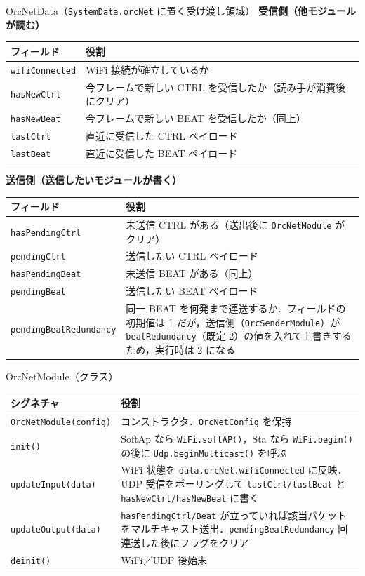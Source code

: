 \documentclass[lualatex,book,paper=a4paper,jafontsize=11.5pt,jafontscale=1.05]{jlreq}
\begin{document}
\begin{apibox}{OrcNetData（\texttt{SystemData.orcNet} に置く受け渡し領域）}
\textbf{受信側（他モジュールが読む）}\\[2pt]
\begin{tabular}{l p{}}
\toprule
\textbf{フィールド} & \textbf{役割} \\
\midrule
\texttt{wifiConnected} & WiFi 接続が確立しているか \\
\texttt{hasNewCtrl}    & 今フレームで新しい CTRL を受信したか（読み手が消費後にクリア） \\
\texttt{hasNewBeat}    & 今フレームで新しい BEAT を受信したか（同上） \\
\texttt{lastCtrl}      & 直近に受信した CTRL ペイロード \\
\texttt{lastBeat}      & 直近に受信した BEAT ペイロード \\
\bottomrule
\end{tabular}

\medskip
\textbf{送信側（送信したいモジュールが書く）}\\[2pt]
\begin{tabular}{l p{}}
\toprule
\textbf{フィールド} & \textbf{役割} \\
\midrule
\texttt{hasPendingCtrl}        & 未送信 CTRL がある（送出後に \texttt{OrcNetModule} がクリア） \\
\texttt{pendingCtrl}           & 送信したい CTRL ペイロード \\
\texttt{hasPendingBeat}        & 未送信 BEAT がある（同上） \\
\texttt{pendingBeat}           & 送信したい BEAT ペイロード \\
\texttt{pendingBeatRedundancy} & 同一 BEAT を何発まで連送するか．フィールドの初期値は 1 だが，送信側（\texttt{OrcSenderModule}）が \texttt{beatRedundancy}（既定 2）の値を入れて上書きするため，実行時は 2 になる \\
\bottomrule
\end{tabular}
\end{apibox}

\begin{apibox}{OrcNetModule（クラス）}
\begin{tabular}{l p{}}
\toprule
\textbf{シグネチャ} & \textbf{役割} \\
\midrule
\texttt{OrcNetModule(config)} & コンストラクタ．\texttt{OrcNetConfig} を保持 \\
\texttt{init()}               & SoftAp なら \texttt{WiFi.softAP()}，Sta なら \texttt{WiFi.begin()} の後に \texttt{Udp.beginMulticast()} を呼ぶ \\
\texttt{updateInput(data)}    & WiFi 状態を \texttt{data.orcNet.wifiConnected} に反映．UDP 受信をポーリングして \texttt{lastCtrl/lastBeat} と \texttt{hasNewCtrl/hasNewBeat} に書く \\
\texttt{updateOutput(data)}   & \texttt{hasPendingCtrl/Beat} が立っていれば該当パケットをマルチキャスト送出．\texttt{pendingBeatRedundancy} 回連送した後にフラグをクリア \\
\texttt{deinit()}             & WiFi／UDP 後始末 \\
\bottomrule
\end{tabular}
\end{apibox}
\end{document}
